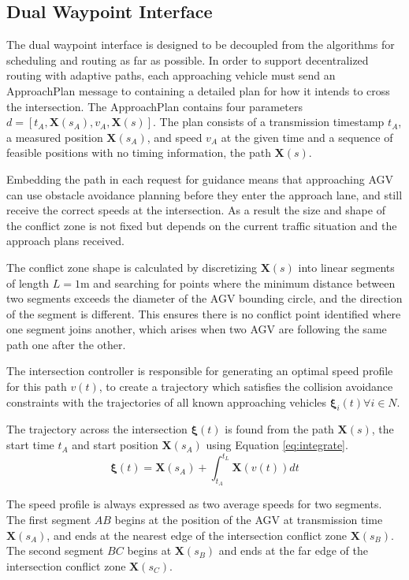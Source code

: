\subsection{Dual Waypoint Interface}
\label{sec:dual_waypoint}
The dual waypoint interface is designed to be decoupled from the algorithms for scheduling and routing as far as possible. In order to support decentralized routing with adaptive paths, each approaching vehicle must send an ApproachPlan message to containing a detailed plan for how it intends to cross the intersection.  The ApproachPlan contains four parameters $d =\left[ t_A, \bm{X}( s_A ), v_A, \bm{X}(s) \right]$. The plan consists of a transmission timestamp $t_A$, a measured position $\bm{X}(s_A)$, and speed $v_A$ at the given time and a sequence of feasible positions with no timing information, the path $\bm{X}(s)$. 

Embedding the path in each request for guidance means that approaching AGV can use obstacle avoidance planning before they enter the approach lane, and still receive the correct speeds at the intersection. As a result the size and shape of the conflict zone is not fixed but depends on the current traffic situation and the approach plans received.

The conflict zone shape is calculated by discretizing $\bm{X}(s)$ into linear segments of length $L=1$m and searching for points where the minimum distance between two segments exceeds the diameter of the AGV bounding circle, and the direction of the segment is different. This ensures there is no conflict point identified where one segment joins another, which arises when two AGV are following the same path one after the other.  

The intersection controller is responsible for generating an optimal speed profile for this path $v(t)$, to create a trajectory which satisfies the collision avoidance constraints with the trajectories of all known approaching vehicles $\bm{\xi}_i(t) \forall i \in N$. 

The trajectory across the intersection $\bm{\xi}(t)$ is found from the path $\bm{X}(s)$, the start time $t_A$ and start position $\bm{X}(s_A)$ using Equation \ref{eq:integrate}.
\begin{equation}
\bm{\xi}(t)  = \bm{X}(s_A) + \int_{t_A}^{t_L} \bm{X}\left( v(t) \right)  dt
\label{eq:integrate}
\end{equation}

The speed profile is always expressed as two average speeds for two segments. The first segment $AB$ begins at the position of the AGV at transmission time $\bm{X}(s_A)$, and ends at the nearest edge of the intersection conflict zone $\bm{X}(s_B)$. The second segment $BC$ begins at $\bm{X}(s_B)$ and ends at the far edge of the intersection conflict zone $\bm{X}(s_C)$.  

